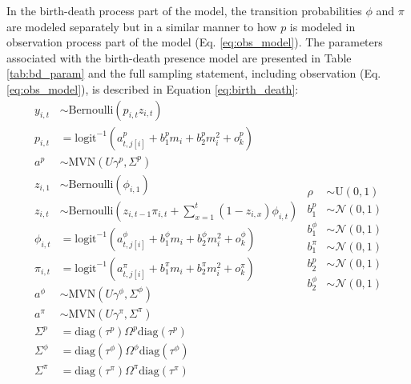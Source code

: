 \documentclass[12pt,letterpaper]{article}
\begin{document}
In the birth-death process part of the model, the transition probabilities \(\phi\) and \(\pi\) are modeled separately but in a similar manner to how \(p\) is modeled in observation process part of the model (Eq. \ref{eq:obs_model}). The parameters associated with the birth-death presence model are presented in Table \ref{tab:bd_param} and the full sampling statement, including observation (Eq. \ref{eq:obs_model}), is described in Equation \ref{eq:birth_death}:
\begin{equation}
  \begin{split}
    y_{i, t} &\sim \text{Bernoulli}(p_{i, t} z_{i, t}) \\
    p_{i, t} &= \text{logit}^{-1}(a^{p}_{t, j[i]} + b^{p}_{1} m_{i} + b^{p}_{2} m_{i}^{2} + o^{p}_{k}) \\
    a^{p} &\sim \text{MVN}(U \gamma^{p}, \Sigma^{p}) \\
    z_{i, 1} &\sim \text{Bernoulli}(\phi_{i, 1}) \\
    z_{i, t} &\sim \text{Bernoulli}\left(z_{i, t - 1} \pi_{i,t} + \sum_{x = 1}^{t}(1 - z_{i, x}) \phi_{i,t}\right) \\
    \phi_{i, t} &= \text{logit}^{-1}(a^{\phi}_{t, j[i]} + b^{\phi}_{1} m_{i} + b^{\phi}_{2} m_{i}^{2} + o^{\phi}_{k}) \\
    \pi_{i, t} &= \text{logit}^{-1}(a^{\pi}_{t, j[i]} + b^{\pi}_{1} m_{i} + b^{\pi}_{2} m_{i}^{2} + o^{\pi}_{k}) \\
    a^{\phi} &\sim \text{MVN}(U \gamma^{\phi}, \Sigma^{\phi}) \\
    a^{\pi} &\sim \text{MVN}(U \gamma^{\pi}, \Sigma^{\pi}) \\
    \Sigma^{p} &= \text{diag}(\tau^{p}) \Omega^{p} \text{diag}(\tau^{p}) \\
    \Sigma^{\phi} &= \text{diag}(\tau^{\phi}) \Omega^{\phi} \text{diag}(\tau^{\phi}) \\
    \Sigma^{\pi} &= \text{diag}(\tau^{\pi}) \Omega^{\pi} \text{diag}(\tau^{\pi}) \\
  \end{split}
  \begin{split}
    \rho &\sim \text{U}(0, 1) \\
    b^{p}_{1} &\sim \mathcal{N}(0, 1) \\
    b^{\phi}_{1} &\sim \mathcal{N}(0, 1) \\
    b^{\pi}_{1} &\sim \mathcal{N}(0, 1) \\
    b^{p}_{2} &\sim \mathcal{N}(0, 1) \\
    b^{\phi}_{2} &\sim \mathcal{N}(0, 1) \\

\end{split}
\end{equation}
\end{document}
